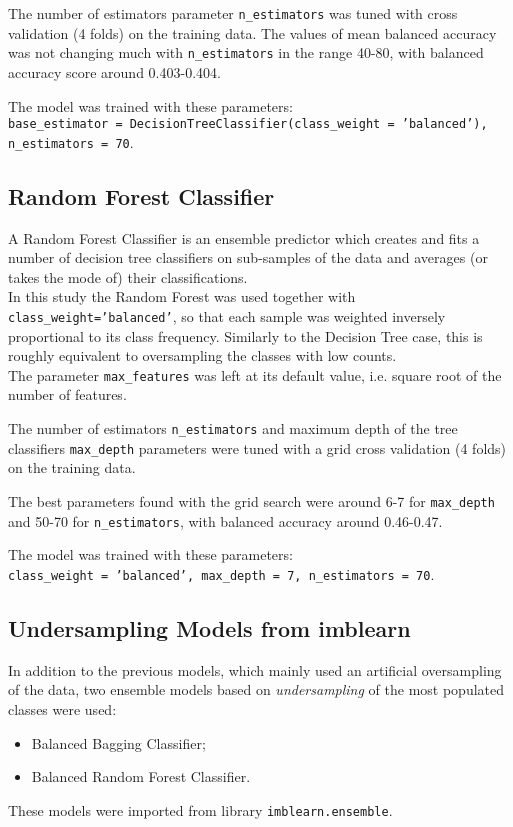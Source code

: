 \documentclass[11pt]{article}
\begin{document}
The number of estimators parameter \texttt{n\_estimators} was tuned with cross validation (4 folds) on the training data. The values of mean balanced accuracy was not changing much with \texttt{n\_estimators} in the range 40-80, with balanced accuracy score around 0.403-0.404.

The model was trained with these parameters:\\
\texttt{base\_estimator = DecisionTreeClassifier(class\_weight = 'balanced'), n\_estimators = 70}.

    \hypertarget{random-forest-classifier}{%
\subsection{Random Forest Classifier}\label{random-forest-classifier}}

A Random Forest Classifier is an ensemble predictor which creates and fits a number of decision tree classifiers on sub-samples of the data and averages (or takes the mode of) their classifications.\\
In this study the Random Forest was used together with \texttt{class\_weight='balanced'}, so that each sample was weighted inversely proportional to its class frequency. Similarly to the Decision Tree case, this is roughly equivalent to oversampling the classes with low counts.\\
The parameter \texttt{max\_features} was left at its default value, i.e. square root of the number of features.

The number of estimators \texttt{n\_estimators} and maximum depth of the tree classifiers \texttt{max\_depth} parameters were tuned with a grid cross validation (4 folds) on the training data.

The best parameters found with the grid search were around 6-7 for \texttt{max\_depth} and 50-70 for \texttt{n\_estimators}, with balanced accuracy around 0.46-0.47.

The model was trained with these parameters:\\
\texttt{class\_weight = 'balanced', max\_depth = 7, n\_estimators = 70}.

    \hypertarget{balanced-models}{%
\subsection{Undersampling Models from imblearn}\label{balanced-models}}

In addition to the previous models, which mainly used an artificial oversampling of the data, two ensemble models based on \emph{undersampling} of the most populated classes were used:
\begin{itemize}
\item Balanced Bagging Classifier;
\item Balanced Random Forest Classifier.
\end{itemize}
These models were imported from library \texttt{imblearn.ensemble}.
\end{document}
